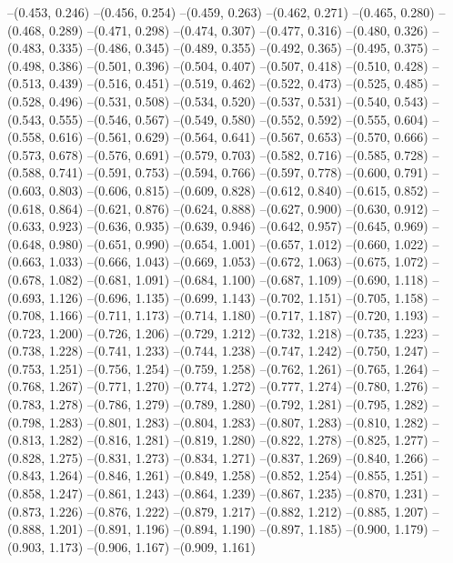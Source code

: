 {--(0.453, 0.246)
--(0.456, 0.254)
--(0.459, 0.263)
--(0.462, 0.271)
--(0.465, 0.280)
--(0.468, 0.289)
--(0.471, 0.298)
--(0.474, 0.307)
--(0.477, 0.316)
--(0.480, 0.326)
--(0.483, 0.335)
--(0.486, 0.345)
--(0.489, 0.355)
--(0.492, 0.365)
--(0.495, 0.375)
--(0.498, 0.386)
--(0.501, 0.396)
--(0.504, 0.407)
--(0.507, 0.418)
--(0.510, 0.428)
--(0.513, 0.439)
--(0.516, 0.451)
--(0.519, 0.462)
--(0.522, 0.473)
--(0.525, 0.485)
--(0.528, 0.496)
--(0.531, 0.508)
--(0.534, 0.520)
--(0.537, 0.531)
--(0.540, 0.543)
--(0.543, 0.555)
--(0.546, 0.567)
--(0.549, 0.580)
--(0.552, 0.592)
--(0.555, 0.604)
--(0.558, 0.616)
--(0.561, 0.629)
--(0.564, 0.641)
--(0.567, 0.653)
--(0.570, 0.666)
--(0.573, 0.678)
--(0.576, 0.691)
--(0.579, 0.703)
--(0.582, 0.716)
--(0.585, 0.728)
--(0.588, 0.741)
--(0.591, 0.753)
--(0.594, 0.766)
--(0.597, 0.778)
--(0.600, 0.791)
--(0.603, 0.803)
--(0.606, 0.815)
--(0.609, 0.828)
--(0.612, 0.840)
--(0.615, 0.852)
--(0.618, 0.864)
--(0.621, 0.876)
--(0.624, 0.888)
--(0.627, 0.900)
--(0.630, 0.912)
--(0.633, 0.923)
--(0.636, 0.935)
--(0.639, 0.946)
--(0.642, 0.957)
--(0.645, 0.969)
--(0.648, 0.980)
--(0.651, 0.990)
--(0.654, 1.001)
--(0.657, 1.012)
--(0.660, 1.022)
--(0.663, 1.033)
--(0.666, 1.043)
--(0.669, 1.053)
--(0.672, 1.063)
--(0.675, 1.072)
--(0.678, 1.082)
--(0.681, 1.091)
--(0.684, 1.100)
--(0.687, 1.109)
--(0.690, 1.118)
--(0.693, 1.126)
--(0.696, 1.135)
--(0.699, 1.143)
--(0.702, 1.151)
--(0.705, 1.158)
--(0.708, 1.166)
--(0.711, 1.173)
--(0.714, 1.180)
--(0.717, 1.187)
--(0.720, 1.193)
--(0.723, 1.200)
--(0.726, 1.206)
--(0.729, 1.212)
--(0.732, 1.218)
--(0.735, 1.223)
--(0.738, 1.228)
--(0.741, 1.233)
--(0.744, 1.238)
--(0.747, 1.242)
--(0.750, 1.247)
--(0.753, 1.251)
--(0.756, 1.254)
--(0.759, 1.258)
--(0.762, 1.261)
--(0.765, 1.264)
--(0.768, 1.267)
--(0.771, 1.270)
--(0.774, 1.272)
--(0.777, 1.274)
--(0.780, 1.276)
--(0.783, 1.278)
--(0.786, 1.279)
--(0.789, 1.280)
--(0.792, 1.281)
--(0.795, 1.282)
--(0.798, 1.283)
--(0.801, 1.283)
--(0.804, 1.283)
--(0.807, 1.283)
--(0.810, 1.282)
--(0.813, 1.282)
--(0.816, 1.281)
--(0.819, 1.280)
--(0.822, 1.278)
--(0.825, 1.277)
--(0.828, 1.275)
--(0.831, 1.273)
--(0.834, 1.271)
--(0.837, 1.269)
--(0.840, 1.266)
--(0.843, 1.264)
--(0.846, 1.261)
--(0.849, 1.258)
--(0.852, 1.254)
--(0.855, 1.251)
--(0.858, 1.247)
--(0.861, 1.243)
--(0.864, 1.239)
--(0.867, 1.235)
--(0.870, 1.231)
--(0.873, 1.226)
--(0.876, 1.222)
--(0.879, 1.217)
--(0.882, 1.212)
--(0.885, 1.207)
--(0.888, 1.201)
--(0.891, 1.196)
--(0.894, 1.190)
--(0.897, 1.185)
--(0.900, 1.179)
--(0.903, 1.173)
--(0.906, 1.167)
--(0.909, 1.161)
}
